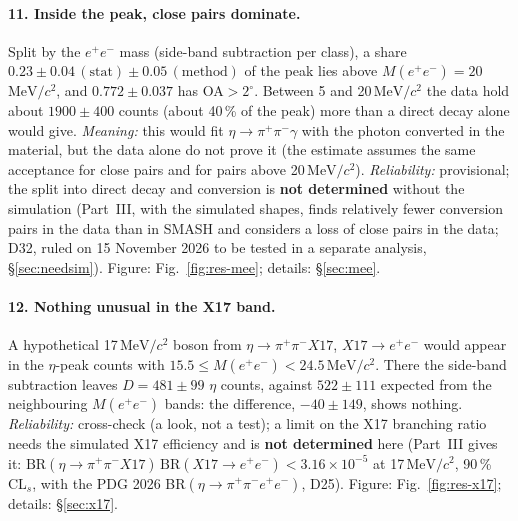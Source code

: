 \documentclass[11pt,a4paper]{article}
\newcommand{\ee}{\ensuremath{e^{+}e^{-}}\xspace}
\newcommand{\pipi}{\ensuremath{\pi^{+}\pi^{-}}\xspace}
\newcommand{\ppee}{\ensuremath{\pi^{+}\pi^{-}e^{+}e^{-}}\xspace}
\newcommand{\Mee}{\ensuremath{M(e^{+}e^{-})}\xspace}
\newcommand{\MeVcc}{\ensuremath{\mathrm{MeV}/c^{2}}\xspace}
\begin{document}
\paragraph{11. Inside the peak, close pairs dominate.} Split by the \ee mass (side-band subtraction per class), a share
$0.23\pm0.04\,(\mathrm{stat})\pm0.05\,(\mathrm{method})$ of the peak lies above $\Mee=20$\,\MeVcc, and $0.772\pm0.037$ has OA$>2^\circ$.
Between 5 and 20\,\MeVcc the data hold about $1900\pm400$ counts (about 40\,\% of the peak) more than a direct decay alone would give.
\emph{Meaning:} this would fit $\eta\to\pipi\gamma$ with the photon converted in the material, but the data alone do not prove it
(the estimate assumes the same acceptance for close pairs and for pairs above 20\,\MeVcc). \emph{Reliability:} provisional; the
split into direct decay and conversion is \textbf{not determined} without the simulation (Part~III, with the simulated shapes, finds
relatively fewer conversion pairs in the data than in SMASH and considers a loss of close pairs in the data; D32, ruled on 15 November
2026 to be tested in a separate analysis, \S\ref{sec:needsim}). Figure: Fig.~\ref{fig:res-mee}; details: \S\ref{sec:mee}.

\paragraph{12. Nothing unusual in the X17 band.} A hypothetical 17\,\MeVcc boson from $\eta\to\pipi X17$, $X17\to\ee$ would appear
in the $\eta$-peak counts with $15.5\le\Mee<24.5$\,\MeVcc. There the side-band subtraction leaves $D=481\pm99$ $\eta$ counts, against
$522\pm111$ expected from the neighbouring \Mee bands: the difference, $-40\pm149$, shows nothing. \emph{Reliability:} cross-check (a
look, not a test); a limit on the X17 branching ratio needs the simulated X17 efficiency and is \textbf{not determined} here (Part~III
gives it: $\mathrm{BR}(\eta\to\pipi X17)\,\mathrm{BR}(X17\to\ee)<3.16\times10^{-5}$ at 17\,\MeVcc, 90\,\% CL$_s$, with the PDG 2026
BR$(\eta\to\ppee)$, D25). Figure: Fig.~\ref{fig:res-x17}; details: \S\ref{sec:x17}.
\end{document}

